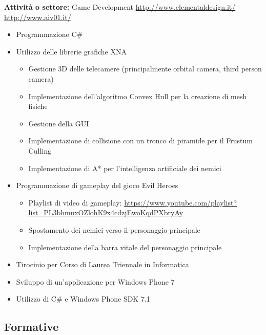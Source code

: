 \documentclass[11pt,a4paper,sans]{moderncv} %
\begin{document}
{
	\textbf{Attivit\`{a} o settore:} Game Development
	\newline{}
	\url{http://www.elementaldesign.it/}
	\newline{}
	\url{http://www.aiv01.it/} 
	\begin{itemize}
		\item Programmazione C\#
		\item Utilizzo delle librerie grafiche XNA
		\begin{itemize}
			\item Gestione 3D delle telecamere (principalmente orbital camera, third person camera)
			\item Implementazione dell'algoritmo Convex Hull per la creazione di mesh fisiche
			\item Gestione della GUI
			\item Implementazione di collisione con un tronco di piramide per il Frustum Culling
			\item Implementazione di A* per l'intelligenza artificiale dei nemici
		\end{itemize}
		\item Programmazione di gameplay del gioco Evil Heroes
		\begin{itemize}
			\item Playlist di video di gameplay:
			\newline{}
			\url{https://www.youtube.com/playlist?list=PL3bhmuxOZlohK9x4cdzjEwoKqdPXbryAy}
			\item Spostamento dei nemici verso il personaggio principale
			\item Implementazione della barra vitale del personaggio principale
		\end{itemize}
	\end{itemize}
}

{
	\begin{itemize}
		\item Tirocinio per Corso di Laurea Triennale in Informatica
		\item Sviluppo di un'applicazione per Windows Phone 7
		\item Utilizzo di C\# e Windows Phone SDK 7.1
	\end{itemize}
}


\subsection{Formative}
\end{document}
